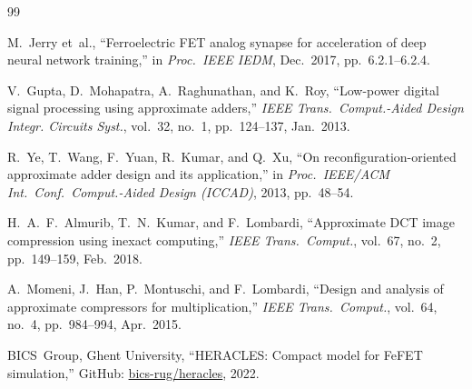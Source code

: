 \documentclass[letterpaper, 10 pt, conference]{ieeeconf}  %
\begin{document}
\begin{thebibliography}{99}

M.~Jerry et~al., ``Ferroelectric FET analog synapse for acceleration of deep
neural network training,'' in \emph{Proc.\ IEEE IEDM}, Dec.\ 2017,
pp.~6.2.1--6.2.4.

V.~Gupta, D.~Mohapatra, A.~Raghunathan, and K.~Roy, ``Low-power digital signal
processing using approximate adders,'' \emph{IEEE Trans.\ Comput.-Aided Design
Integr. Circuits Syst.}, vol.~32, no.~1, pp.~124--137, Jan.\ 2013.

R.~Ye, T.~Wang, F.~Yuan, R.~Kumar, and Q.~Xu, ``On reconfiguration-oriented
approximate adder design and its application,'' in \emph{Proc.\ IEEE/ACM Int.\
Conf.\ Comput.-Aided Design (ICCAD)}, 2013, pp.~48--54.

H.~A.~F.~Almurib, T.~N.~Kumar, and F.~Lombardi, ``Approximate DCT image
compression using inexact computing,'' \emph{IEEE Trans.\ Comput.}, vol.~67,
no.~2, pp.~149--159, Feb.\ 2018.

A.~Momeni, J.~Han, P.~Montuschi, and F.~Lombardi, ``Design and analysis of
approximate compressors for multiplication,'' \emph{IEEE Trans.\ Comput.},
vol.~64, no.~4, pp.~984--994, Apr.\ 2015.

BICS~Group, Ghent University, ``HERACLES: Compact model for FeFET simulation,''
GitHub: \url{bics-rug/heracles}, 2022.

\end{thebibliography}
\end{document}
